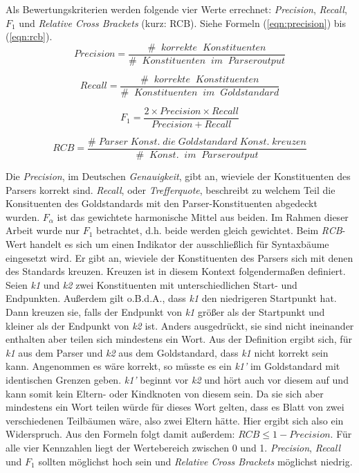 Als Bewertungskriterien werden folgende vier Werte errechnet: \textit{Precision}, \textit{Recall}, \(F_1\) und \textit{Relative Cross Brackets} (kurz: RCB). Siehe Formeln (\ref{eqn:precision}) bis (\ref{eqn:rcb}). \\ 
\begin{equation}
Precision = \frac{\# \;\; korrekte \;\; Konstituenten}{ \# \;\; Konstituenten \;\; im \;\; Parseroutput}
\label{eqn:precision}
\end{equation}

\begin{equation}
Recall = \frac{\# \;\; korrekte \;\; Konstituenten}{ \# \;\; Konstituenten \;\; im \;\; Goldstandard}
\end{equation}

\begin{equation}
F_1 = \frac{2 \times Precision \times Recall}{ Precision + Recall}
\end{equation}

\begin{equation}
RCB = \frac{\# \; Parser \; Konst. \; die \; Goldstandard \; Konst. \; kreuzen}{ \# \;\; Konst. \;\; im \;\; Parseroutput}
\label{eqn:rcb}
\end{equation}

Die \textit{Precision}, im Deutschen \textit{Genauigkeit}, gibt an, wieviele der Konstituenten des Parsers korrekt sind. \textit{Recall}, oder \textit{Trefferquote}, beschreibt zu welchem Teil die Konsituenten des Goldstandards mit den Parser-Konstituenten abgedeckt wurden. \(F_\alpha\) ist das gewichtete harmonische Mittel aus beiden. Im Rahmen dieser Arbeit wurde nur \(F_1\) betrachtet, d.h. beide werden gleich gewichtet. Beim \textit{RCB}-Wert handelt es sich um einen Indikator der ausschließlich für Syntaxbäume eingesetzt wird. Er gibt an, wieviele der Konstituenten des Parsers sich mit denen des Standards kreuzen. Kreuzen ist in diesem Kontext folgendermaßen definiert. Seien \textit{k1} und \textit{k2} zwei Konstituenten mit unterschiedlichen Start- und Endpunkten. Außerdem gilt o.B.d.A., dass \textit{k1} den niedrigeren Startpunkt hat. Dann kreuzen sie, falls der Endpunkt von \textit{k1} größer als der Startpunkt und kleiner als der Endpunkt von \textit{k2} ist. Anders ausgedrückt, sie sind nicht ineinander enthalten aber teilen sich mindestens ein Wort. %
Aus der Definition ergibt sich, für \textit{k1} aus dem Parser und \textit{k2} aus dem Goldstandard, dass \textit{k1} nicht korrekt sein kann. Angenommen es wäre korrekt, so müsste es ein \textit{k1'} im Goldstandard mit identischen Grenzen geben. \textit{k1'} beginnt vor \textit{k2} und hört auch vor diesem auf und kann somit kein Eltern- oder Kindknoten von diesem sein. Da sie sich aber mindestens ein Wort teilen würde für dieses Wort gelten, dass es Blatt von zwei verschiedenen Teilbäumen wäre, also zwei Eltern hätte. Hier ergibt sich also ein Widerspruch. Aus den Formeln folgt damit außerdem: \( RCB \leq 1 - Precision \). Für alle vier Kennzahlen liegt der Wertebereich zwischen 0 und 1. \textit{Precision}, \textit{Recall} und \(F_1\) sollten möglichst hoch sein und \textit{Relative Cross Brackets} möglichst niedrig.